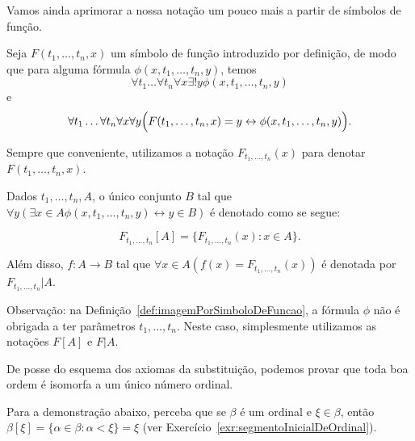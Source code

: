 Vamos ainda aprimorar a nossa notação um pouco mais a partir de símbolos de função.
\begin{definition}[$\ZFmPI$]\label{def:imagemPorSimboloDeFuncao}
    Seja $F(t_1, \dots, t_n, x)$ um símbolo de função introduzido por definição, de modo que para alguma fórmula $\phi(x, t_1, \dots, t_n, y)$, temos
    \[
        \forall t_1 \dots \forall t_n \forall x \exists! y \phi(x, t_1, \dots, t_n, y)
    \]
    e
    \[
        \forall t_1 \dots \forall t_n \forall x \forall y
        \Bigl( F(t_1, \dots, t_n, x)=y \leftrightarrow \phi(x, t_1, \dots, t_n, y)\Bigr).
    \]

    Sempre que conveniente, utilizamos a notação $F_{t_1, \dots, t_n}(x)$ para denotar $F(t_1, \dots, t_n, x)$.

    Dados $t_1, \dots, t_n, A$,
    o único conjunto $B$ tal que $\forall y (\exists x\in A \phi(x, t_1, \dots, t_n, y)\leftrightarrow y \in B)$ é denotado como se segue:
    
    \[
        F_{t_1, \dots, t_n}[A]=\{F_{t_1, \dots, t_n}(x) : x\in A\}.
    \]

    Além disso, $f: A\to B$ tal que $\forall x\in A (f(x)=F_{t_1, \dots, t_n}(x))$ é denotada por $F_{t_1, \dots, t_n}|A$.
\end{definition}
Observação: na Definição~\ref{def:imagemPorSimboloDeFuncao}, a fórmula $\phi$ não é obrigada a ter parâmetros $t_1, \dots, t_n$.
Neste caso, simplesmente utilizamos as notações $F[A]$ e $F|A$.

De posse do esquema dos axiomas da substituição, podemos provar que toda boa ordem é isomorfa a um único número ordinal.

Para a demonstração abaixo, perceba que se $\beta$ é um ordinal e $\xi \in \beta$, então $\beta[\xi]=\{\alpha \in \beta : \alpha<\xi\}=\xi$ (ver Exercício~\ref{exr:segmentoInicialDeOrdinal}).

